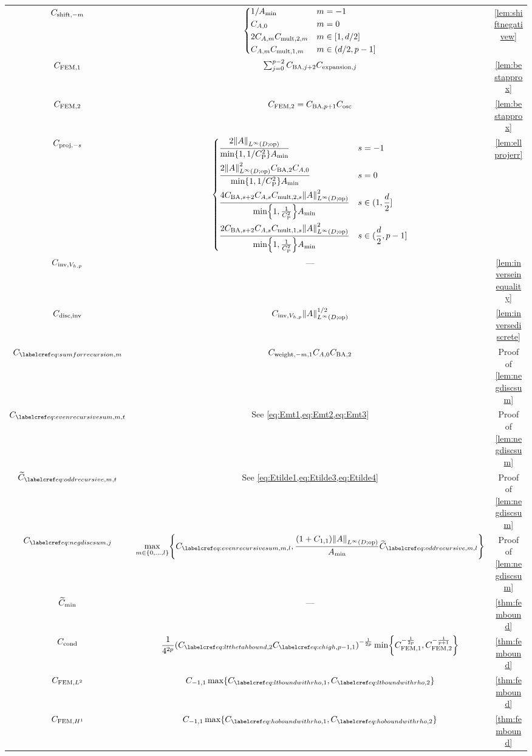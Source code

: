 \begin{longtabu}{ccc}
  $C_{\mathrm{shift},-m}$ &$\displaystyle
  \begin{dcases}
  1/A_{\min} & m=-1\\
  C_{A,0} & m = 0\\
  2C_{A,m}C_{\mathrm{mult},2,m} & m \in [1,d/2]\\
C_{A,m}C_{\mathrm{mult},1,m} & m \in (d/2,p-1]
\end{dcases}
$
& \cref{lem:shiftnegativew}\\
  $C_{\mathrm{FEM},1}$ & $\sum_{j=0}^{p-2}C_{\mathrm{BA},j+2}C_{\mathrm{expansion},j} $ & \cref{lem:bestapprox}\\
  $C_{\mathrm{FEM},2}$ & $C_{\mathrm{FEM},2} = C_{\mathrm{BA},p+1}C_{\mathrm{osc}}$ & \cref{lem:bestapprox}\\
  $C_{\mathrm{proj},-s}$ &$\displaystyle
  \begin{dcases}
    \frac{2\NLiDop{A}}{\min\set{1,1/\CP^2}\Amin} & s = -1\\
      \frac{2\NLiDop{A}^2\CSZfn{2}\CAfn{0}}{\min\set{1,1/\CP^2}\Amin} & s = 0\\
  \frac{4\CSZfn{s+2}\CAfn{s}\Cprod{s}\NLiDop{A}^2}{\min\set{1,\frac1{\CP^2}}\Amin} & s \in (1,\frac{d}2]\\
\frac{2\CSZfn{s+2}\CAfn{s}\CBanfn{s}\NLiDop{A}^2}{\min\set{1,\frac1{\CP^2}}\Amin} & s \in (\frac{d}2,p-1]
  \end{dcases}
  $
& \cref{lem:ellprojerr} \\
  $C_{\mathrm{inv},V_{h,p}}$ &---& \cref{lem:inverseinequality}\\
  $C_{\mathrm{disc},\mathrm{inv}}$ & $\CinvVhp \NLiDop{A}^{1/2}$ & \cref{lem:inversediscrete}\\
  $\Cm$ & $C_{\mathrm{weight},-m,1}  C_{A,0} C_{\mathrm{BA},2}$ & Proof of \cref{lem:negdiscsum}\\
  $\Efn{m,t}$ & See \cref{eq:Emt1,eq:Emt2,eq:Emt3} & Proof of \cref{lem:negdiscsum}\\
  $\Etildefn{m,t}$ & See \cref{eq:Etilde1,eq:Etilde3,eq:Etilde4} & Proof of \cref{lem:negdiscsum}\\
  $\Csumj$ &$\displaystyle\max_{m \in \set{0,\ldots,l}}\set{\Efn{m,l},\frac{\mleft(1+\Cfn{1,1}\mright)\NLiDop{A}}{\Amin}\Etildefn{m,l}}$ & Proof of \cref{lem:negdiscsum}\\
  $\widetilde{C}_{\min}$&---&\cref{thm:fembound}\\
  $C_{\mathrm{cond}}$ & $\displaystyle\frac1{4^{2p}} \mleft(\Csecond\Chighfn{p-1,1}\mright)^{-\frac1{2p}} \min\set{\CFEMo^{-\frac1{2p}},\CFEMt^{-\frac1{p+1}}}$ & \cref{thm:fembound}\\
  $C_{\mathrm{FEM},L^{2}}$ &$\Cfn{-1,1} \max\set{\CLtboundo,\CLtboundt}$&\cref{thm:fembound}\\
  $C_{\mathrm{FEM},H^{1}}$ &$\Cfn{-1,1}\max\set{\CHoboundo,\CHoboundt}$&\cref{thm:fembound}\\

\end{longtabu}
